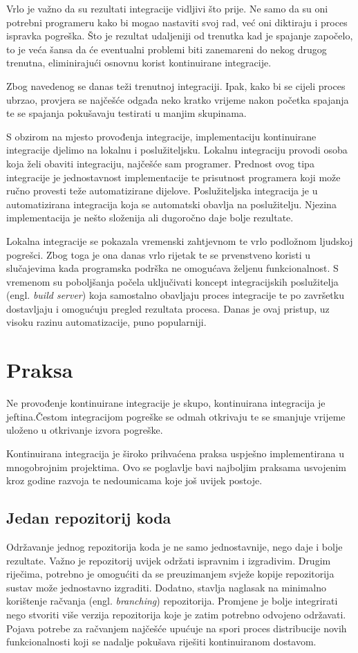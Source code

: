 \documentclass[times, utf8, seminar, numeric]{fer}
\newcommand{\eng}[1]{(engl. \textit{#1})}
\begin{document}
Vrlo je važno da su rezultati integracije vidljivi što prije. Ne samo da su oni potrebni programeru kako bi mogao nastaviti svoj rad, već oni diktiraju i proces ispravka pogreška. Što je rezultat udaljeniji od trenutka kad je spajanje započelo, to je veća šansa da će eventualni problemi biti zanemareni do nekog drugog trenutna, eliminirajući osnovnu korist kontinuirane integracije.

Zbog navedenog se danas teži trenutnoj integraciji. Ipak, kako bi se cijeli proces ubrzao, provjera se najčešće odgađa neko kratko vrijeme nakon početka spajanja te se spajanja pokušavaju testirati u manjim skupinama.

S obzirom na mjesto provođenja integracije, implementaciju kontinuirane integracije djelimo na lokalnu i poslužiteljsku. Lokalnu integraciju provodi osoba koja želi obaviti integraciju, najčešće sam programer. Prednost ovog tipa integracije je jednostavnost implementacije te prisutnost programera koji može ručno provesti teže automatizirane dijelove. Poslužiteljska integracija je u automatizirana integracija koja se automatski obavlja na poslužitelju. Njezina implementacija je nešto složenija ali dugoročno daje bolje rezultate.

Lokalna integracije se pokazala vremenski zahtjevnom te vrlo podložnom ljudskoj pogrešci. Zbog toga je ona danas vrlo rijetak te se prvenstveno koristi u slučajevima kada programska podrška ne omogućava željenu funkcionalnost. S vremenom su poboljšanja počela uključivati koncept integracijskih poslužitelja \eng{build server} koja samostalno obavljaju proces integracije te po završetku dostavljaju i omogućuju pregled rezultata procesa. Danas je ovaj pristup, uz visoku razinu automatizacije, puno popularniji.

\section{Praksa}
Ne provođenje kontinuirane integracije je skupo, kontinuirana integracija je jeftina.Čestom integracijom pogreške se odmah otkrivaju te se smanjuje vrijeme uloženo u otkrivanje izvora pogreške. 

Kontinuirana integracija je široko prihvaćena praksa uspješno implementirana u mnogobrojnim projektima. Ovo se poglavlje bavi najboljim praksama usvojenim kroz godine razvoja te nedoumicama koje još uvijek postoje.

\subsection{Jedan repozitorij koda}
Održavanje jednog repozitorija koda je ne samo jednostavnije, nego daje i bolje rezultate. Važno je repozitorij uvijek održati ispravnim i izgradivim. Drugim riječima, potrebno je omogućiti da se preuzimanjem svježe kopije repozitorija sustav može jednostavno izgraditi. Dodatno, stavlja naglasak na minimalno korištenje račvanja \eng{branching} repozitorija. Promjene je bolje integrirati nego stvoriti više verzija repozitorija koje je zatim potrebno odvojeno održavati\citep{tw:CI}. Pojava potrebe za račvanjem najčešće upućuje na spori proces distribucije novih funkcionalnosti koji se nadalje pokušava riješiti kontinuiranom dostavom.
\end{document}
